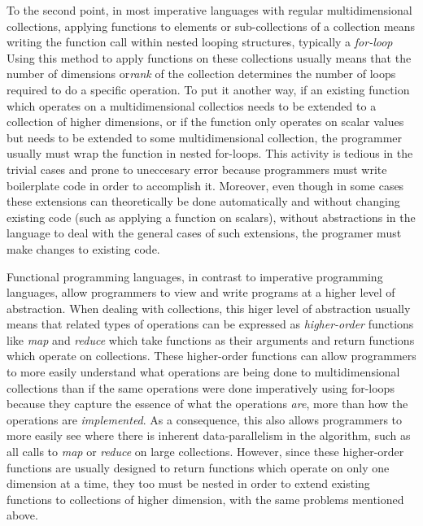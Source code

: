 To the second point, in most imperative languages with regular multidimensional collections, applying functions to elements or sub-collections of a collection means writing the function call within nested looping structures, typically a \textit{for-loop}
Using this method to apply functions on these collections usually means that the number of dimensions or\textit{rank} of the collection determines the number of loops required to do a specific operation.
To put it another way, if an existing function which operates on a multidimensional collectios needs to be extended to a collection of higher dimensions, 
or if the function only operates on scalar values but needs to be extended to some multidimensional collection, 
the programmer usually must wrap the function in nested for-loops.
This activity is tedious in the trivial cases and prone to uneccesary error because programmers must write boilerplate code in order to accomplish it.
Moreover, even though in some cases these extensions can theoretically be done automatically and without changing existing code (such as applying a function on scalars), 
without abstractions in the language to deal with the general cases of such extensions, the programer must make changes to existing code.

Functional programming languages, in contrast to imperative programming languages, allow programmers to view and write programs at a higher level of abstraction.
When dealing with collections, this higer level of abstraction usually means that related types of operations can be expressed as \textit{higher-order} functions 
like \textit{map} and \textit{reduce} which take functions as their arguments and return functions which operate on collections.
These higher-order functions can allow programmers to more easily understand what operations are being done to multidimensional collections 
than if the same operations were done imperatively using for-loops 
because they capture the essence of what the operations \textit{are}, more than how the operations are \textit{implemented}.
As a consequence, this also allows programmers to more easily see where there is inherent data-parallelism in the algorithm, such as all calls to \textit{map} or \textit{reduce} on large collections.
However, since these higher-order functions are usually designed to return functions which operate on only one dimension at a time, 
they too must be nested in order to extend existing functions to collections of higher dimension, with the same problems mentioned above.

